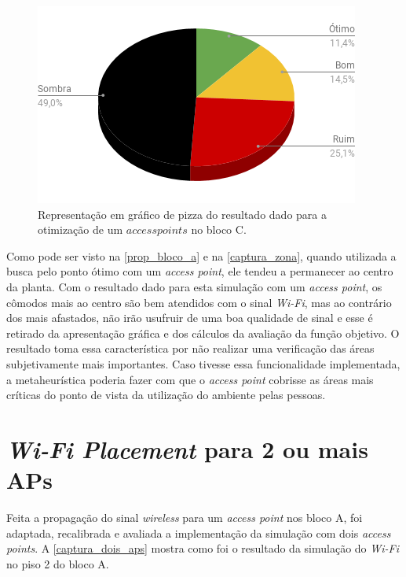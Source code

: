 \documentclass[
	12pt,				%
	twoside,			%
	a4paper,			%
	english,			%
	french,				%
	spanish,			%
	brazil				%
	]{abntex2}
\begin{document}
\begin{figure}[ht]
    \caption{\label{prop_bloco_percent_c_1} Representação em gráfico de pizza do resultado dado para a otimização
     de um $access points$ no bloco C. }
    \begin{center}
        \includegraphics[scale=0.7]{imagens/prop-bloco-percent-c-1.png}
    \end{center}
\end{figure}

Como pode ser visto na \autoref{prop_bloco_a} e na
\autoref{captura_zona}, quando utilizada a busca pelo ponto ótimo com um
\emph{access point}, ele tendeu a permanecer ao centro da planta. Com o
resultado dado para esta simulação com um \emph{access point}, os
cômodos mais ao centro são bem atendidos com o sinal \emph{Wi-Fi}, mas
ao contrário dos mais afastados, não irão usufruir de uma boa qualidade
de sinal e esse é retirado da apresentação gráfica e dos cálculos da
avaliação da função objetivo. O resultado toma essa característica por
não realizar uma verificação das áreas subjetivamente mais importantes.
Caso tivesse essa funcionalidade implementada, a metaheurística poderia
fazer com que o \emph{access point} cobrisse as áreas mais críticas do
ponto de vista da utilização do ambiente pelas pessoas.

\section{\texorpdfstring{\emph{Wi-Fi Placement} para 2 ou mais
APs}{Wi-Fi Placement para 2 ou mais APs}}\label{wi-fi-placement-para-2-ou-mais-aps}

Feita a propagação do sinal \emph{wireless} para um \emph{access point}
nos bloco A, foi adaptada, recalibrada e avaliada a implementação da
simulação com dois \emph{access points}. A \autoref{captura_dois_aps}
mostra como foi o resultado da simulação do \emph{Wi-Fi} no piso 2 do
bloco A.
\end{document}
